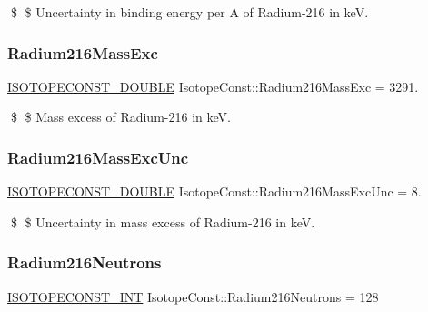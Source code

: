 \$ \$ Uncertainty in binding energy per A of Radium-\/216 in keV. \mbox{\label{group___isotope_const-_radium-_ra216_gad852180fb0cc13284fb75e8c7b1cad8e}} 
\subsubsection{\texorpdfstring{Radium216\+Mass\+Exc}{Radium216MassExc}}
{\footnotesize\ttfamily \mbox{\hyperlink{group___isotope_const-_macros_ga8f45a7272ce02c0b4c65c44636ed719a}{I\+S\+O\+T\+O\+P\+E\+C\+O\+N\+S\+T\+\_\+\+D\+O\+U\+B\+LE}} Isotope\+Const\+::\+Radium216\+Mass\+Exc = 3291.}

\$ \$ Mass excess of Radium-\/216 in keV. \mbox{\label{group___isotope_const-_radium-_ra216_gafe3164f246c672977c925dd6eee10877}} 
\subsubsection{\texorpdfstring{Radium216\+Mass\+Exc\+Unc}{Radium216MassExcUnc}}
{\footnotesize\ttfamily \mbox{\hyperlink{group___isotope_const-_macros_ga8f45a7272ce02c0b4c65c44636ed719a}{I\+S\+O\+T\+O\+P\+E\+C\+O\+N\+S\+T\+\_\+\+D\+O\+U\+B\+LE}} Isotope\+Const\+::\+Radium216\+Mass\+Exc\+Unc = 8.}

\$ \$ Uncertainty in mass excess of Radium-\/216 in keV. \mbox{\label{group___isotope_const-_radium-_ra216_ga5f8b4047e00ee3621660389789e6e603}} 
\subsubsection{\texorpdfstring{Radium216\+Neutrons}{Radium216Neutrons}}
{\footnotesize\ttfamily \mbox{\hyperlink{group___isotope_const-_macros_ga5f18360b3e99483a35c32d789e62621c}{I\+S\+O\+T\+O\+P\+E\+C\+O\+N\+S\+T\+\_\+\+I\+NT}} Isotope\+Const\+::\+Radium216\+Neutrons = 128}

